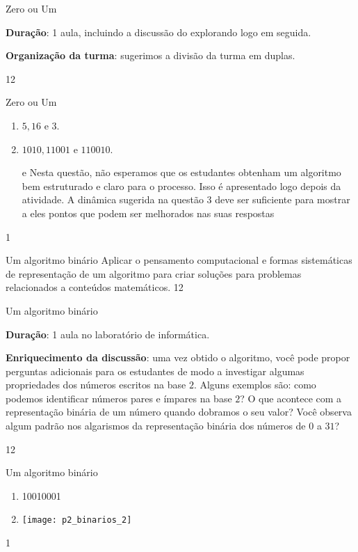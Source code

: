 \begin{sugestions}{Zero ou Um}
{
\textbf{Duração}: 1 aula, incluindo a discussão do explorando logo em seguida.

\textbf{Organização da turma}: sugerimos a divisão da turma em duplas.
}{1}{2}
\end{sugestions}
\begin{answer}{Zero ou Um}
{
\begin{enumerate}[left=1.5em]
\item $5, 16$ e $3$.

\item $1010, 11001 \text{ e } 110010$.

\item[\titem{c)} e \titem{d)}] Nesta questão, não esperamos que os estudantes obtenham um algoritmo bem estruturado e claro para o processo. Isso é apresentado logo depois da atividade. A dinâmica sugerida na questão 3 deve ser suficiente para mostrar a eles pontos que podem ser melhorados nas suas respostas
\end{enumerate}
}{1}
\end{answer}
\clearmargin
\clearmargin
\begin{objectives}{Um algoritmo binário}
{
Aplicar o pensamento computacional e formas sistemáticas de representação de um algoritmo para criar soluções para problemas relacionados a conteúdos matemáticos.
}{1}{2}
\end{objectives}
\begin{sugestions}{Um algoritmo binário}
{
\textbf{Duração}: 1 aula no laboratório de informática.

\textbf{Enriquecimento da discussão}: uma vez obtido o algoritmo, você pode propor perguntas adicionais para os estudantes de modo a investigar algumas propriedades dos números escritos na base $2$. Alguns exemplos são: como podemos identificar números pares e ímpares na base $2$? O que acontece com a representação binária de um número quando dobramos o seu valor? Você observa algum padrão nos algarismos da representação binária dos números de $0$ a $31$?
}{1}{2}
\end{sugestions}
\begin{answer}{Um algoritmo binário}
{
\begin{enumerate}
\item 10010001
\item {}
{
\texttt{[image: p2\_binarios\_2]}
}
\end{enumerate}
}{1}
\end{answer}
\label{comp-exp6}

